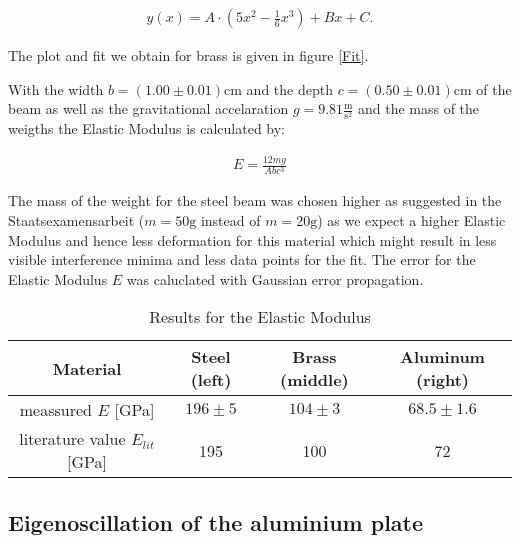 \begin{align*}
y(x)=A\cdot\left(5x^2-\frac{1}{6}x^3\right)+Bx+C .
\end{align*}  

The plot and fit we obtain for brass is given in figure \ref{Fit}.



With the width  $b=(1.00\pm0.01)\mathrm{cm}$ and the depth  $c=(0.50\pm0.01)\mathrm{cm}$ of the beam as well as the gravitational accelaration $g=9.81\frac{\mathrm{m}}{\mathrm{s}^2}$ and the mass of the weigths the Elastic Modulus is calculated by: 

\begin{align}
E=\frac{12mg}{Abc^3}
\end{align}

The mass of the weight for the steel beam was chosen higher as suggested in the Staatsexamensarbeit \cite{staats} ($m=50\mathrm{g}$ instead of $m=20\mathrm{g}$) as we expect a higher Elastic Modulus and hence less deformation for this material  which might result in less visible interference minima and less data points for the fit.
The error for the Elastic Modulus $E$ was caluclated with Gaussian error propagation.

\begin{table}[h!]
	\centering
	\begin{tabular}{c|c|c|c}
		Material							& Steel (left)	& Brass (middle)	& Aluminum (right)\\ \hline\hline
		meassured $E$ [GPa]			& $196\pm5$	& 	$104\pm3$		& $68.5\pm1.6$			\\ \hline
	literature value \cite{staats} $E_{lit}$ [GPa]	& 195			& 100				& 72
	\end{tabular}
	\caption{Results for the Elastic Modulus}
\end{table}

\subsection{Eigenoscillation of the aluminium plate}


